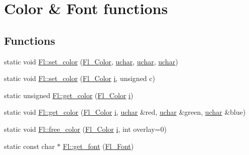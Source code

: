 \hypertarget{group__fl__attributes}{}\section{Color \& Font functions}
\label{group__fl__attributes}
\subsection*{Functions}
\begin{DoxyCompactItemize}
\item 
static void \hyperlink{group__fl__attributes_gaed9b5e5a196cbbf3918cca83cb280d7a}{Fl\+::set\+\_\+color} (\hyperlink{_enumerations_8_h_a8b762953646f8abee866061f1af78a6a}{Fl\+\_\+\+Color}, \hyperlink{fl__types_8h_a65f85814a8290f9797005d3b28e7e5fc}{uchar}, \hyperlink{fl__types_8h_a65f85814a8290f9797005d3b28e7e5fc}{uchar}, \hyperlink{fl__types_8h_a65f85814a8290f9797005d3b28e7e5fc}{uchar})
\item 
static void \hyperlink{group__fl__attributes_ga6e7b4ee94a41e8f345f1d11fe20f8ff2}{Fl\+::set\+\_\+color} (\hyperlink{_enumerations_8_h_a8b762953646f8abee866061f1af78a6a}{Fl\+\_\+\+Color} \hyperlink{forms_8_h_acb559820d9ca11295b4500f179ef6392}{i}, unsigned c)
\item 
static unsigned \hyperlink{group__fl__attributes_gaafd4aeaec9c7fadd27b7771f087355d3}{Fl\+::get\+\_\+color} (\hyperlink{_enumerations_8_h_a8b762953646f8abee866061f1af78a6a}{Fl\+\_\+\+Color} \hyperlink{forms_8_h_acb559820d9ca11295b4500f179ef6392}{i})
\item 
static void \hyperlink{group__fl__attributes_gad41ba457eaa9d980e1221eb8fd174968}{Fl\+::get\+\_\+color} (\hyperlink{_enumerations_8_h_a8b762953646f8abee866061f1af78a6a}{Fl\+\_\+\+Color} \hyperlink{forms_8_h_acb559820d9ca11295b4500f179ef6392}{i}, \hyperlink{fl__types_8h_a65f85814a8290f9797005d3b28e7e5fc}{uchar} \&red, \hyperlink{fl__types_8h_a65f85814a8290f9797005d3b28e7e5fc}{uchar} \&green, \hyperlink{fl__types_8h_a65f85814a8290f9797005d3b28e7e5fc}{uchar} \&blue)
\item 
static void \hyperlink{group__fl__attributes_ga33e301d16b1679406c52a092785639f4}{Fl\+::free\+\_\+color} (\hyperlink{_enumerations_8_h_a8b762953646f8abee866061f1af78a6a}{Fl\+\_\+\+Color} \hyperlink{forms_8_h_acb559820d9ca11295b4500f179ef6392}{i}, int overlay=0)
\item 
static const char $\ast$ \hyperlink{group__fl__attributes_ga10f7749e09d9a15585f0c748dcd2bc9a}{Fl\+::get\+\_\+font} (\hyperlink{_enumerations_8_h_a2ac46d9f082834b969fffe490a03a709}{Fl\+\_\+\+Font})

\end{DoxyCompactItemize}
